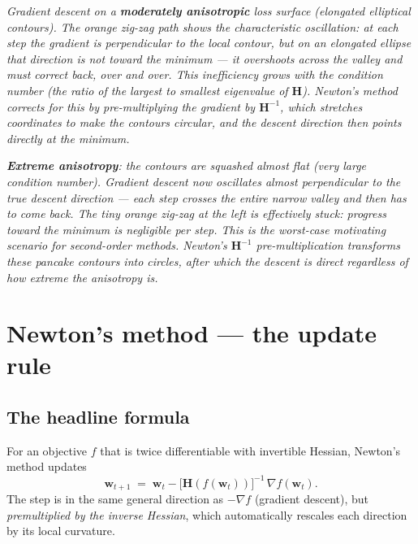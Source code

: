 \documentclass[11pt, a4paper]{article}
\begin{document}
\begin{center}

\footnotesize\textit{Gradient descent on a \textbf{moderately anisotropic} loss surface (elongated elliptical contours). The orange zig-zag path shows the characteristic oscillation: at each step the gradient is perpendicular to the local contour, but on an elongated ellipse that direction is \emph{not} toward the minimum --- it overshoots across the valley and must correct back, over and over. This inefficiency grows with the condition number (the ratio of the largest to smallest eigenvalue of $\mathbf{H}$). Newton's method corrects for this by pre-multiplying the gradient by $\mathbf{H}^{-1}$, which stretches coordinates to make the contours circular, and the descent direction then points directly at the minimum.}
\end{center}

\begin{center}

\footnotesize\textit{\textbf{Extreme anisotropy}: the contours are squashed almost flat (very large condition number). Gradient descent now oscillates almost perpendicular to the true descent direction --- each step crosses the entire narrow valley and then has to come back. The tiny orange zig-zag at the left is effectively stuck: progress toward the minimum is negligible per step. This is the worst-case motivating scenario for second-order methods. Newton's $\mathbf{H}^{-1}$ pre-multiplication transforms these pancake contours into circles, after which the descent is direct regardless of how extreme the anisotropy is.}
\end{center}

\section{Newton's method --- the update rule}

\subsection{The headline formula}

\begin{defbox}
For an objective $f$ that is twice differentiable with invertible Hessian, Newton's method updates
\[
\boxed{\;\mathbf{w}_{t+1} \;=\; \mathbf{w}_t - \big[\mathbf{H}(f(\mathbf{w}_t))\big]^{-1}\,\nabla f(\mathbf{w}_t).\;}
\]
The step is in the same general direction as $-\nabla f$ (gradient descent), but \emph{premultiplied by the inverse Hessian}, which automatically rescales each direction by its local curvature.
\end{defbox}
\end{document}

